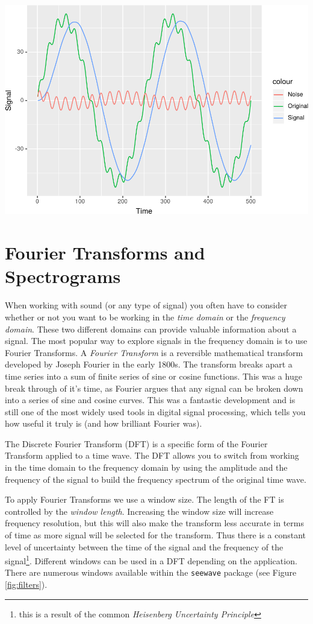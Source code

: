 \documentclass[]{krantz}
\begin{document}
\includegraphics{bookdown_files/figure-latex/unnamed-chunk-313-1.pdf}

\hypertarget{fourier-transforms-and-spectrograms}{%
\section{Fourier Transforms and Spectrograms}\label{fourier-transforms-and-spectrograms}}

When working with sound (or any type of signal) you often have to consider whether or not you want to be working in the \emph{time domain} or the \emph{frequency domain}. These two different domains can provide valuable information about a signal. The most popular way to explore signals in the frequency domain is to use Fourier Transforms. A \emph{Fourier Transform} is a reversible mathematical transform developed by Joseph Fourier in the early 1800s. The transform breaks apart a time series into a sum of finite series of sine or cosine functions. This was a huge break through of it's time, as Fourier argues that any signal can be broken down into a series of sine and cosine curves. This was a fantastic development and is still one of the most widely used tools in digital signal processing, which tells you how useful it truly is (and how brilliant Fourier was).

The Discrete Fourier Transform (DFT) is a specific form of the Fourier Transform applied to a time wave. The DFT allows you to switch from working in the time domain to the frequency domain by using the amplitude and the frequency of the signal to build the frequency spectrum of the original time wave.

To apply Fourier Transforms we use a window size. The length of the FT is controlled by the \emph{window length}. Increasing the window size will increase frequency resolution, but this will also make the transform less accurate in terms of time as more signal will be selected for the transform. Thus there is a constant level of uncertainty between the time of the signal and the frequency of the signal\footnote{this is a result of the common \emph{Heisenberg Uncertainty Principle}}. Different windows can be used in a DFT depending on the application. There are numerous windows available within the \texttt{seewave} package (see Figure \ref{fig:filters}).
\end{document}

